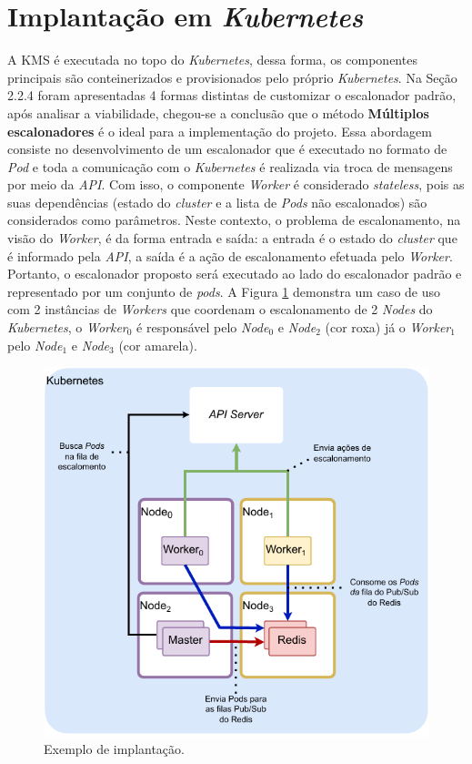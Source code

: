 \section{Implantação em \textit{Kubernetes}}
A \ac{KMS} é executada no topo do \textit{Kubernetes}, dessa forma, os componentes principais são conteinerizados e provisionados pelo próprio \textit{Kubernetes}. Na Seção 2.2.4 foram apresentadas 4 formas distintas de customizar o escalonador padrão, após analisar a viabilidade, chegou-se a conclusão que o método \textbf{Múltiplos escalonadores} é o ideal para a implementação do projeto. Essa abordagem consiste no desenvolvimento de um escalonador que é executado no formato de \textit{Pod} e toda a comunicação com o \textit{Kubernetes} é realizada via troca de mensagens por meio da \textit{API}. Com isso, o componente \textit{Worker} é considerado \textit{stateless}, pois as suas dependências (estado do \textit{cluster} e a lista de \textit{Pods} não escalonados) são considerados como parâmetros. Neste contexto, o problema de escalonamento, na visão do \textit{Worker}, é da forma entrada e saída: a entrada é o estado do \textit{cluster} que é informado pela \textit{API}, a saída é a ação de escalonamento efetuada pelo \textit{Worker}. Portanto, o escalonador proposto será executado ao lado do escalonador padrão e representado por um conjunto de \textit{pods}. A Figura \ref{fig:proposta_kubernetes} demonstra um caso de uso com 2 instâncias de \textit{Workers} que coordenam o escalonamento de 2 \textit{Nodes} do \textit{Kubernetes}, o \textit{Worker$_0$} é responsável pelo \textit{Node$_0$} e \textit{Node$_2$} (cor roxa) já o \textit{Worker$_1$} pelo \textit{Node$_1$} e \textit{Node$_3$} (cor amarela).

\begin{figure}[h!]
	\caption{\label{fig:proposta_kubernetes}Exemplo de implantação.}
	\centering
	\includegraphics[width=.7\linewidth]{assets/arquitetura-worker.pdf}
\end{figure}


